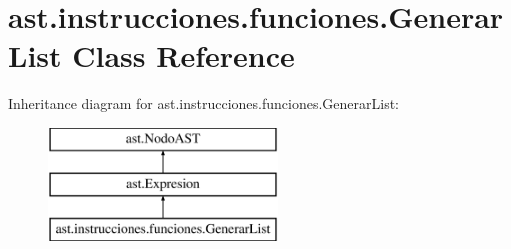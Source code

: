 \hypertarget{classast_1_1instrucciones_1_1funciones_1_1_generar_list}{}\section{ast.\+instrucciones.\+funciones.\+Generar\+List Class Reference}
\label{classast_1_1instrucciones_1_1funciones_1_1_generar_list}
Inheritance diagram for ast.\+instrucciones.\+funciones.\+Generar\+List\+:\begin{figure}[H]
\begin{center}
\leavevmode
\includegraphics[height=3.000000cm]{classast_1_1instrucciones_1_1funciones_1_1_generar_list}
\end{center}
\end{figure}
